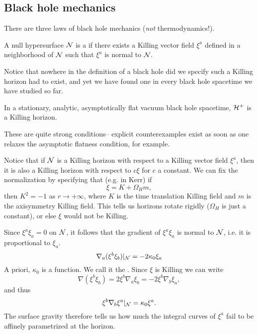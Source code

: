 
\subsection*{Black hole mechanics}
There are three laws of black hole mechanics (\emph{not} thermodynamics!).
\begin{defn}
    A null hypersurface $\mathcal N$ is a  if there exists a Killing vector field $\xi^a$ defined in a neighborhood of $\mathcal N$ such that $\xi^a$ is normal to $\mathcal N.$
\end{defn}
Notice that nowhere in the definition of a black hole did we specify such a Killing horizon had to exist, and yet we have found one in every black hole spacetime we have studied so far.
\begin{thm}[Hawking 1972]
    In a stationary, analytic, asymptotically flat vacuum black hole spacetime, $\mathcal H^+$ is a Killing horizon.
\end{thm}
These are quite strong conditions-- explicit counterexamples exist as soon as one relaxes the asymptotic flatness condition, for example. 

Notice that if $\mathcal N$ is a Killing horizon with respect to a Killing vector field $\xi^a$, then it is also a Killing horizon with respect to $c\xi$ for $c$ a constant. We can fix the normalization by specifying that (e.g. in Kerr) if
\begin{equation}
    \xi = K+\Omega_H m,
\end{equation}
then $K^2=-1$ as $r\to +\infty$, where $K$ is the time translation Killing field and $m$ is the axisymmetry Killing field. This tells us horizons rotate rigidly ($\Omega_H$ is just a constant), or else $\xi$ would not be Killing.

Since $\xi^a\xi_a=0$ on $\mathcal N$, it follows that the gradient of $\xi^a\xi_a$ is normal to $\mathcal N$, i.e. it is proportional to $\xi_a$.
\begin{equation}
    \nabla_a(\xi^b \xi_b)|_\mathcal N = -2 \kappa_0 \xi_a
\end{equation}
A priori, $\kappa_0$ is a function. We call it the . Since $\xi$ is Killing we can write
\begin{equation}
    \nabla(\xi^b \xi_b) = 2 \xi^b \nabla_a \xi_b = -2 \xi^b \nabla_b \xi_a,
\end{equation}
and thus
\begin{equation}
    \xi^b \nabla_b \xi^a|_{\mathcal N} = \kappa_0 \xi^a.
\end{equation}
The surface gravity therefore tells us how much the integral curves of $\xi^a$ fail to be affinely parametrized at the horizon.

